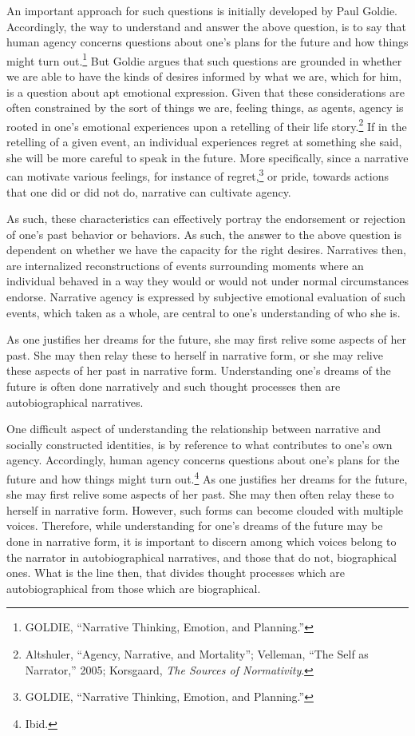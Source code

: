 \documentclass[phdthesis,12pt,final]{wuthesis}
\theoremstyle{definition}
\theoremstyle{definition}
\theoremstyle{definition}
\theoremstyle{definition}
\theoremstyle{remark}
\begin{document}
An important approach for such questions is initially developed by Paul Goldie. Accordingly, the way to understand and answer the above question, is to say that human agency concerns questions about one's plans for the future and how things might turn out.\footnote{GOLDIE, {``Narrative {Thinking}, {Emotion}, and {Planning}.''}} But Goldie argues that such questions are grounded in whether we are able to have the kinds of desires informed by what we are, which for him, is a question about apt emotional expression. Given that these considerations are often constrained by the sort of things we are, feeling things, as agents, agency is rooted in one's emotional experiences upon a retelling of their life story.\footnote{Altshuler, {``Agency, Narrative, and Mortality''}; Velleman, {``The {Self} as {Narrator},''} 2005; Korsgaard, \emph{The Sources of Normativity}.} If in the retelling of a given event, an individual experiences regret at something she said, she will be more careful to speak in the future. More specifically, since a narrative can motivate various feelings, for instance of regret,\footnote{GOLDIE, {``Narrative {Thinking}, {Emotion}, and {Planning}.''}} or pride, towards actions that one did or did not do, narrative can cultivate agency.

As such, these characteristics can effectively portray the endorsement or rejection of one's past behavior or behaviors. As such, the answer to the above question is dependent on whether we have the capacity for the right desires. Narratives then, are internalized reconstructions of events surrounding moments where an individual behaved in a way they would or would not under normal circumstances endorse. Narrative agency is expressed by subjective emotional evaluation of such events, which taken as a whole, are central to one's understanding of who she is.

As one justifies her dreams for the future, she may first relive some aspects of her past. She may then relay these to herself in narrative form, or she may relive these aspects of her past in narrative form. Understanding one's dreams of the future is often done narratively and such thought processes then are autobiographical narratives.

One difficult aspect of understanding the relationship between narrative and socially constructed identities, is by reference to what contributes to one's own agency. Accordingly, human agency concerns questions about one's plans for the future and how things might turn out.\footnote{Ibid.} As one justifies her dreams for the future, she may first relive some aspects of her past. She may then often relay these to herself in narrative form. However, such forms can become clouded with multiple voices. Therefore, while understanding for one's dreams of the future may be done in narrative form, it is important to discern among which voices belong to the narrator in autobiographical narratives, and those that do not, biographical ones. What is the line then, that divides thought processes which are autobiographical from those which are biographical.
\end{document}
